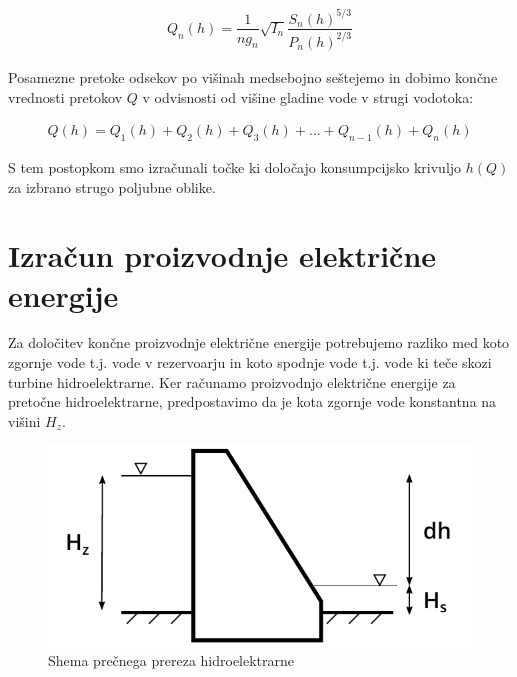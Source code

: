 \begin{ceqn}
	\begin{align}
	Q_n(h) = \dfrac{1}{ng_n} \sqrt{I_n}\dfrac{S_n(h)^{5/3}}{P_n(h)^{2/3}}
	\end{align}
\end{ceqn}


Posamezne pretoke odsekov po višinah medsebojno seštejemo in dobimo končne vrednosti pretokov $Q$ v odvisnosti od višine gladine vode v strugi vodotoka:

\begin{ceqn}
\begin{align}
Q(h) = Q_1(h) + Q_2(h) + Q_3(h) + ... + Q_{n-1}(h) + Q_n(h)
\end{align}
\end{ceqn}


S tem postopkom smo izračunali točke ki določajo konsumpcijsko krivuljo $h(Q)$ za izbrano strugo poljubne oblike.


\newpage

\section{Izračun proizvodnje električne energije}
Za določitev končne proizvodnje električne energije potrebujemo razliko med koto zgornje vode t.j. vode v rezervoarju in koto spodnje vode t.j. vode ki teče skozi turbine hidroelektrarne. Ker računamo proizvodnjo električne energije za pretočne hidroelektrarne, predpostavimo da je kota zgornje vode konstantna na višini $H_z$.

\begin{figure}[ht!]
	\begin{centering}
		\includegraphics{slike/electricityProduction/powerplant_crossSection.pdf}
		\caption{Shema prečnega prereza hidroelektrarne}
	\end{centering}
\end{figure}

